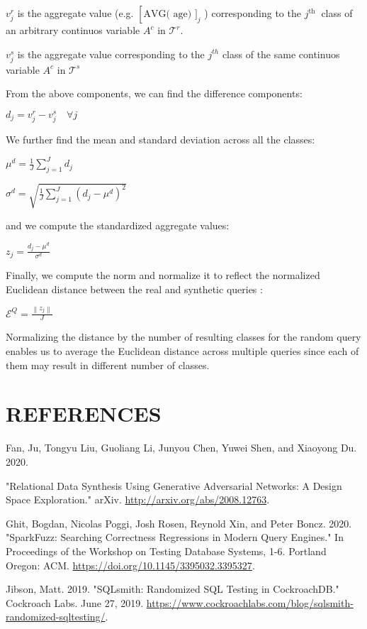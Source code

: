 \documentclass[10pt]{article}
\begin{document}
$v_{j}^{r}$ is the aggregate value (e.g. $\left[\mathrm{AVG}(\text { age) }]_{j}\right.$ ) corresponding to the $j^{\text {th }}$ class of an arbitrary continuos variable $A^{c}$ in $\mathcal{T}^{r}$.

$v_{j}^{s}$ is the aggregate value corresponding to the $j^{t h}$ class of the same continuos variable $A^{c}$ in $\mathcal{T}^{s}$

From the above components, we can find the difference components:

$d_{j}=v_{j}^{r}-v_{j}^{s} \quad \forall j$

We further find the mean and standard deviation across all the classes:

$\mu^{d}=\frac{1}{J} \sum_{j=1}^{J} d_{j}$

$\sigma^{d}=\sqrt{\frac{1}{J} \sum_{j=1}^{J}\left(d_{j}-\mu^{d}\right)^{2}}$

and we compute the standardized aggregate values:

$z_{j}=\frac{d_{j}-\mu^{d}}{\sigma^{d}}$

Finally, we compute the norm and normalize it to reflect the normalized Euclidean distance between the real and synthetic queries :

$\mathcal{E}^{Q}=\frac{\left\|z_{j}\right\|}{J}$

Normalizing the distance by the number of resulting classes for the random query enables us to average the Euclidean distance across multiple queries since each of them may result in different number of classes.

\section{REFERENCES}
Fan, Ju, Tongyu Liu, Guoliang Li, Junyou Chen, Yuwei Shen, and Xiaoyong Du. 2020.

"Relational Data Synthesis Using Generative Adversarial Networks: A Design Space Exploration." arXiv. \href{http://arxiv.org/abs/2008.12763}{http://arxiv.org/abs/2008.12763}.

Ghit, Bogdan, Nicolas Poggi, Josh Rosen, Reynold Xin, and Peter Boncz. 2020. "SparkFuzz: Searching Correctness Regressions in Modern Query Engines." In Proceedings of the Workshop on Testing Database Systems, 1-6. Portland Oregon: ACM. \href{https://doi.org/10.1145/3395032.3395327}{https://doi.org/10.1145/3395032.3395327}.

Jibson, Matt. 2019. "SQLsmith: Randomized SQL Testing in CockroachDB." Cockroach Labs. June 27, 2019. \href{https://www.cockroachlabs.com/blog/sqlsmith-randomized-sqltesting/}{https://www.cockroachlabs.com/blog/sqlsmith-randomized-sqltesting/}.
\end{document}
